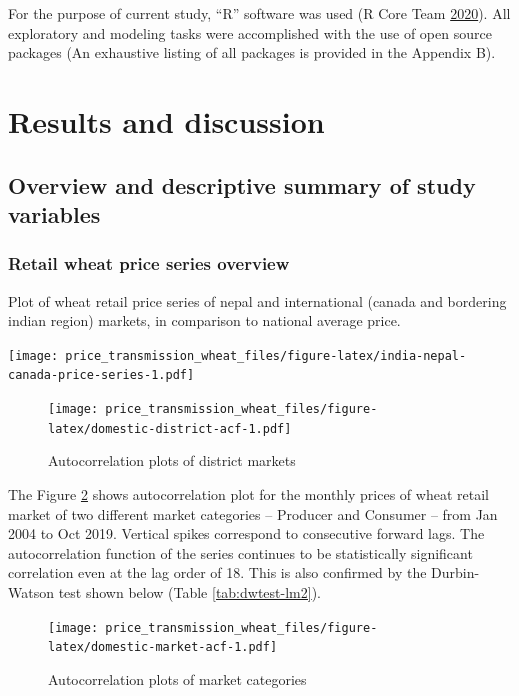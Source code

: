 \documentclass[12pt,]{article}
\begin{document}
For the purpose of current study, ``R'' software was used (R Core Team \protect\hyperlink{ref-rbase2020}{2020}). All exploratory and modeling tasks were accomplished with the use of open source packages (An exhaustive listing of all packages is provided in the Appendix B).

\hypertarget{results-and-discussion}{%
\section{Results and discussion}\label{results-and-discussion}}

\hypertarget{overview-and-descriptive-summary-of-study-variables}{%
\subsection{Overview and descriptive summary of study variables}\label{overview-and-descriptive-summary-of-study-variables}}

\hypertarget{retail-wheat-price-series-overview}{%
\subsubsection{Retail wheat price series overview}\label{retail-wheat-price-series-overview}}

Plot of wheat retail price series of nepal and international (canada and bordering indian region) markets, in comparison to national average price.

\texttt{[image: price\_transmission\_wheat\_files/figure-latex/india-nepal-canada-price-series-1.pdf]}

\begin{figure}
\centering
\texttt{[image: price\_transmission\_wheat\_files/figure-latex/domestic-district-acf-1.pdf]}
\caption{\label{fig:domestic-district-acf}Autocorrelation plots of district markets}
\end{figure}

The Figure \ref{fig:domestic-market-acf} shows autocorrelation plot for the monthly prices of wheat retail market of two different market categories -- Producer and Consumer -- from Jan 2004 to Oct 2019. Vertical spikes correspond to consecutive forward lags. The autocorrelation function of the series continues to be statistically significant correlation even at the lag order of 18. This is also confirmed by the Durbin-Watson test shown below (Table \ref{tab:dwtest-lm2}).

\begin{figure}
\centering
\texttt{[image: price\_transmission\_wheat\_files/figure-latex/domestic-market-acf-1.pdf]}
\caption{\label{fig:domestic-market-acf}Autocorrelation plots of market categories}
\end{figure}
\end{document}
